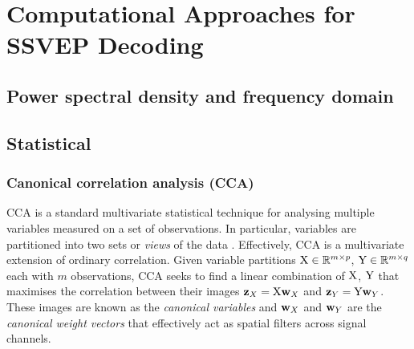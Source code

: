 \section{Computational Approaches for SSVEP Decoding}
\subsection{Power spectral density and frequency domain}
\subsection{Statistical}

\subsubsection{Canonical correlation analysis (CCA)}
\label{subsection:CCA-c2}
CCA is a standard multivariate statistical technique for analysing multiple variables measured on a set of observations. In particular, variables are partitioned into two sets or \textit{views} of the data \cite{cca-tutorial}. Effectively, CCA is a multivariate extension of ordinary correlation. Given variable partitions ${\textrm{X}} \in \mathbb{R}^{m\times p}$, ${\textrm{Y}} \in \mathbb{R}^{m\times q}$ each with $m$ observations, CCA seeks to find a linear combination of ${\textrm{X}}$, ${\textrm{Y}}$ that maximises the correlation between their images ${\mathbf{z}}_X = {\textrm{X}}{\mathbf{w}}_X$ and ${\mathbf{z}}_Y = {\textrm{Y}}{\mathbf{w}}_Y$. These images are known as the \textit{canonical variables} and ${\mathbf{w}}_X$ and ${\mathbf{w}}_Y$ are the \textit{canonical weight vectors} that effectively act as spatial filters across signal channels.

